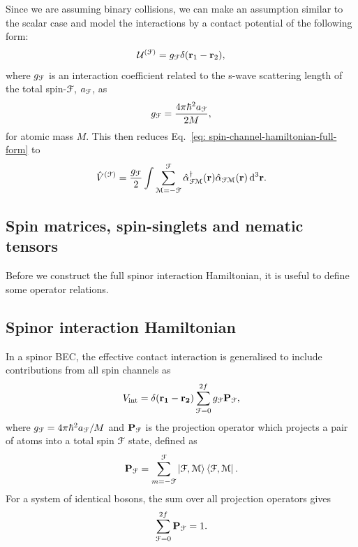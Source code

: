 Since we are assuming binary collisions, we can make an assumption similar to
the scalar case and model the interactions by a contact potential of the
following form:
\begin{align}
    \mathcal{U}^{(\EuScript{F})} = g_\EuScript{F}\delta(\vb{r}_1-\vb{r}_2),
\end{align}
where \(g_\EuScript{F}\) is an interaction coefficient related to the s-wave
scattering length of the total spin-\(\EuScript{F}\), \(a_\EuScript{F}\), as
\begin{align}
    g_\EuScript{F} = \frac{4\pi\hbar^2a_\EuScript{F}}{2M},
\end{align}
for atomic mass \(M\).
This then reduces Eq.~\eqref{eq: spin-channel-hamiltonian-full-form} to
\begin{align}
    \hat{V}^{(\EuScript{F})} = \frac{g_\EuScript{F}}{2}\int
    \sum_{\EuScript{M}=-\EuScript{F}}^{\EuScript{F}}
    \hat{\alpha}^\dagger_{\EuScript{F}\EuScript{M}}(\vb{r})
    \hat{\alpha}_{\EuScript{F}\EuScript{M}}(\vb{r}) \,
    \dd^3\vb{r}.
\end{align}

\subsection{Spin matrices, spin-singlets and nematic tensors}
Before we construct the full spinor interaction Hamiltonian, it is useful to
define some operator relations.

\subsection{Spinor interaction Hamiltonian}
In a spinor BEC, the effective contact interaction is generalised to include
contributions from all spin channels as
\begin{equation}\label{eq: spin-f-interaction-potential}
    V_\mathrm{int} = \delta(\vb{r_1} - \vb{r_2})
    \sum_{\EuScript{F}=0}^{2f}g_\EuScript{F}\vb{P}_\EuScript{F},
\end{equation}
where \(g_\EuScript{F}=4\pi\hbar^2a_\EuScript{F}/M\) and
\(\vb{P}_\EuScript{F}\) is the projection operator which projects a pair
of atoms into a total spin \(\EuScript{F}\) state, defined as
\begin{equation}
    \vb{P}_\EuScript{F} = \sum_{m=-\EuScript{F}}^{\EuScript{F}}
    \ket{\EuScript{F}, \EuScript{M}}\bra{\EuScript{F}, \EuScript{M}}.
\end{equation}
For a system of identical bosons, the sum over all projection operators gives
\begin{equation}\label{eq: completeness-relation}
    \sum_{\EuScript{F}=0}^{2f}\vb{P}_\EuScript{F} = 1.
\end{equation}


